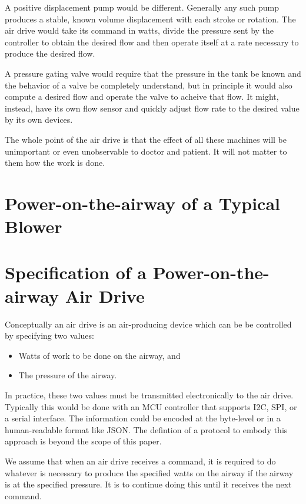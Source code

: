 \documentclass{article}
\begin{document}
A positive displacement pump would be different. Generally any such pump produces a stable, known volume displacement with each
stroke or rotation. The air drive would take its command in watts, divide the pressure sent by the controller to obtain
the desired flow and then operate itself at a rate necessary to produce the desired flow.

A pressure gating valve would require that the pressure in the tank be known and the behavior of a valve
be completely understand, but in principle it would also compute a desired flow and operate the valve to acheive that
flow. It might, instead, have its own flow sensor and quickly adjust flow rate to the desired value by its own devices.

The whole point of the air drive is that the effect of all these machines will be unimportant or even unobservable
to doctor and patient. It will not matter to them how the work is done.

\section{Power-on-the-airway of a Typical Blower}



\section{Specification of a Power-on-the-airway Air Drive}

Conceptually an air drive is an air-producing device which can be be controlled by specifying two values:
\begin{itemize}
 \item Watts of work to be done on the airway, and
 \item The pressure of the airway.
\end{itemize}

In practice, these two values must be transmitted electronically to the air drive.
Typically this would be done with an MCU controller that supports I2C, SPI, or a serial interface.
The information could be encoded at the byte-level or in a human-readable format like JSON.
The defintion of a protocol to embody this approach is beyond the scope of this paper.

We assume that when an air drive receives a command, it is required to
do whatever is necessary to produce the specified
watts on the airway if the airway is at the specified pressure.
It is to continue doing this until it receives the next command.
\end{document}
